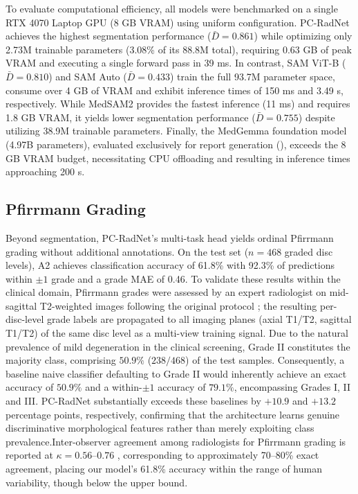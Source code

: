 \documentclass[journal]{IEEEtran}
\newcommand{\modelname}{PC-RadNet}
\begin{document}
To evaluate computational efficiency, all models were benchmarked on a single RTX 4070 Laptop GPU (8 GB VRAM) using uniform configuration. \modelname{} achieves the highest segmentation performance ($\bar{D}=0.861$) while optimizing only 2.73M trainable parameters (3.08\% of its 88.8M total), requiring 0.63 GB of peak VRAM and executing a single forward pass in 39 ms. In contrast, SAM ViT-B ($\bar{D}=0.810$) and SAM Auto ($\bar{D}=0.433$) train the full 93.7M parameter space, consume over 4 GB of VRAM and exhibit inference times of 150 ms and 3.49 s, respectively. While MedSAM2 provides the fastest inference (11 ms) and requires 1.8 GB VRAM, it yields lower segmentation performance ($\bar{D}=0.755$) despite utilizing 38.9M trainable parameters. Finally, the MedGemma foundation model (4.97B parameters), evaluated exclusively for report generation (), exceeds the 8 GB VRAM budget, necessitating CPU offloading and resulting in inference times approaching 200 s.


\subsection{Pfirrmann Grading}
\label{sec:grading_results}

Beyond segmentation, \modelname{}'s multi-task head yields ordinal Pfirrmann grading without additional annotations. On the test set ($n=468$ graded disc levels), A2 achieves classification accuracy of 61.8\% with 92.3\% of predictions within $\pm 1$ grade and a grade MAE of 0.46. To validate these results within the clinical domain, Pfirrmann grades were assessed by an expert radiologist on mid-sagittal T2-weighted images following the original protocol \cite{pfirrmann2001magnetic}; the resulting per-disc-level grade labels are propagated to all imaging planes (axial T1/T2, sagittal T1/T2) of the same disc level as a multi-view training signal. Due to the natural prevalence of mild degeneration in the clinical screening, Grade II constitutes the majority class, comprising $50.9\%$ ($238/468$) of the test samples. Consequently, a baseline naive classifier defaulting to Grade II would inherently achieve an exact accuracy of $50.9\%$ and a within-$\pm 1$ accuracy of $79.1\%$, encompassing Grades I, II and III. \modelname{} substantially exceeds these baselines by $+10.9$ and $+13.2$ percentage points, respectively, confirming that the architecture learns genuine discriminative morphological features rather than merely exploiting class prevalence.Inter-observer agreement among radiologists for Pfirrmann grading is reported at $\kappa = 0.56$--$0.76$ \cite{wilke2006discdegeneration}, corresponding to approximately 70--80\% exact agreement, placing our model's 61.8\% accuracy within the range of human variability, though below the upper bound.
\end{document}
